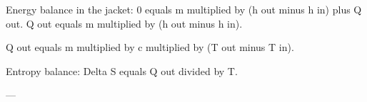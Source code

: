 Energy balance in the jacket:  
0 equals m multiplied by (h out minus h in) plus Q out.  
Q out equals m multiplied by (h out minus h in).  

Q out equals m multiplied by c multiplied by (T out minus T in).  

Entropy balance:  
Delta S equals Q out divided by T.  

---
